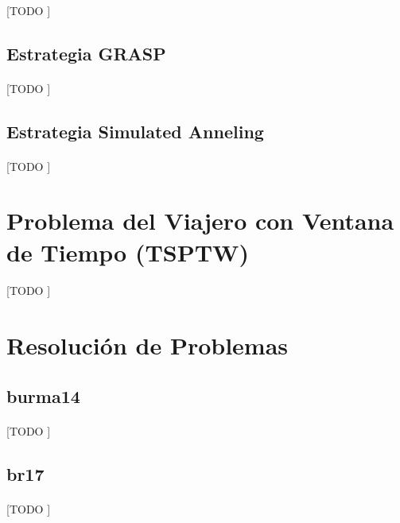\documentclass[spanish]{article}
\begin{document}
			\paragraph{}
			[TODO ]

		\subsection{Estrategia GRASP}

			\paragraph{}
			[TODO ]

		\subsection{Estrategia Simulated Anneling}

			\paragraph{}
			[TODO ]

	\section{Problema del Viajero con Ventana de Tiempo (TSPTW)}

		\paragraph{}
		[TODO ]


	\section{Resolución de Problemas}

		\subsection{burma14}

			\paragraph{}
			[TODO ]

		\subsection{br17}

			\paragraph{}
			[TODO ]
\end{document}
